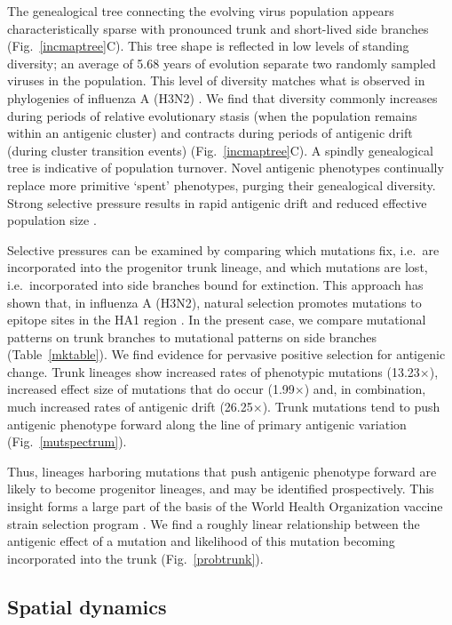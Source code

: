 \documentclass[11pt,oneside,letterpaper]{article}
\begin{document}
The genealogical tree connecting the evolving virus population appears characteristically sparse with pronounced trunk and short-lived side branches  (Fig.~\ref{incmaptree}C).  This tree shape is reflected in low levels of standing diversity; an average of 5.68 years of evolution separate two randomly sampled viruses in the population.  This level of diversity matches what is observed in phylogenies of influenza A (H3N2) \cite{Rambaut08}.  We find that diversity commonly increases during periods of relative evolutionary stasis (when the population remains within an antigenic cluster) and contracts during periods of antigenic drift (during cluster transition events) (Fig.~\ref{incmaptree}C).  A spindly genealogical tree is indicative of population turnover.  Novel antigenic phenotypes continually replace more primitive `spent' phenotypes, purging their genealogical diversity.  Strong selective pressure results in rapid antigenic drift and reduced effective population size \cite{BedfordTreeTopology}.

Selective pressures can be examined by comparing which mutations fix, i.e.\ are incorporated into the progenitor trunk lineage, and which mutations are lost, i.e.\ incorporated into side branches bound for extinction.  This approach has shown that, in influenza A (H3N2), natural selection promotes mutations to epitope sites in the HA1 region \cite{Bush99MBE,Wolf06,Bhatt11}.  In the present case, we compare mutational patterns on trunk branches to mutational patterns on side branches (Table~\ref{mktable}).  We find evidence for pervasive positive selection for antigenic change.  Trunk lineages show increased rates of phenotypic mutations (13.23$\times$), increased effect size of mutations that do occur (1.99$\times$) and, in combination, much increased rates of antigenic drift (26.25$\times$).  Trunk mutations tend to push antigenic phenotype forward along the line of primary antigenic variation (Fig.~\ref{mutspectrum}).  

Thus, lineages harboring mutations that push antigenic phenotype forward are likely to become progenitor lineages, and may be identified prospectively.  This insight forms a large part of the basis of the World Health Organization vaccine strain selection program \cite{Barr10}.  We find a roughly linear relationship between the antigenic effect of a mutation and likelihood of this mutation becoming incorporated into the trunk (Fig.~\ref{probtrunk}).

\subsection*{Spatial dynamics}
\end{document}
